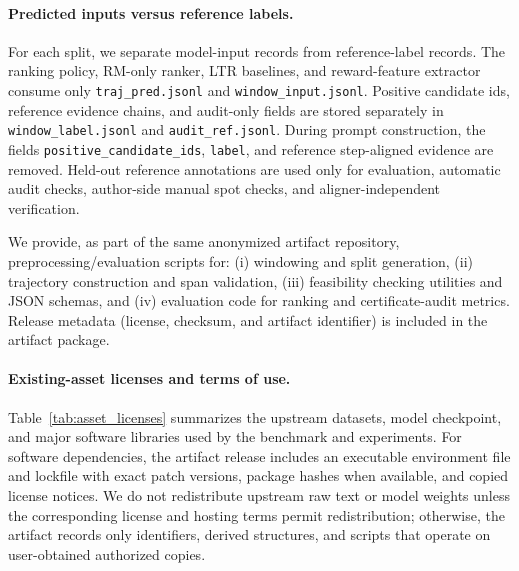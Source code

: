 \documentclass{article}
\begin{document}
\paragraph{Predicted inputs versus reference labels.}
For each split, we separate model-input records from reference-label records.
The ranking policy, RM-only ranker, LTR baselines, and reward-feature extractor consume only
\texttt{traj\_pred.jsonl} and \texttt{window\_input.jsonl}.
Positive candidate ids, reference evidence chains, and audit-only fields are stored separately in
\texttt{window\_label.jsonl} and \texttt{audit\_ref.jsonl}.
During prompt construction, the fields \texttt{positive\_candidate\_ids}, \texttt{label}, and reference step-aligned evidence are removed.
Held-out reference annotations are used only for evaluation, automatic audit checks, author-side manual spot checks, and aligner-independent verification.

We provide, as part of the same anonymized artifact repository, preprocessing/evaluation scripts for:
(i) windowing and split generation,
(ii) trajectory construction and span validation,
(iii) feasibility checking utilities and JSON schemas, and
(iv) evaluation code for ranking and certificate-audit metrics.
Release metadata (license, checksum, and artifact identifier) is included in the artifact package.

\paragraph{Existing-asset licenses and terms of use.}
Table~\ref{tab:asset_licenses} summarizes the upstream datasets, model checkpoint, and major software libraries used by the benchmark and experiments.
For software dependencies, the artifact release includes an executable environment file and lockfile with exact patch versions, package hashes when available, and copied license notices.
We do not redistribute upstream raw text or model weights unless the corresponding license and hosting terms permit redistribution; otherwise, the artifact records only identifiers, derived structures, and scripts that operate on user-obtained authorized copies.
\end{document}

